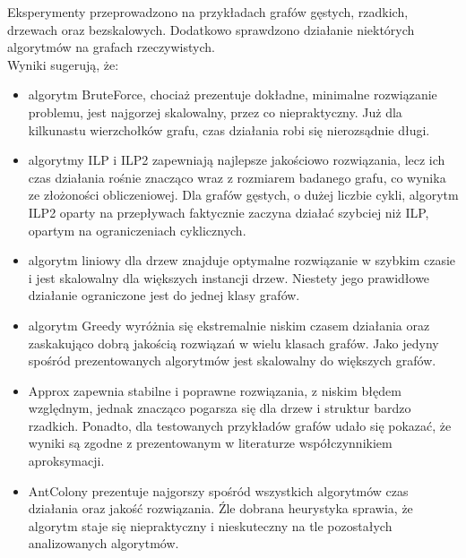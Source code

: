 Eksperymenty przeprowadzono na przykładach grafów gęstych, rzadkich, drzewach oraz bezskalowych. Dodatkowo sprawdzono działanie niektórych algorytmów na grafach rzeczywistych. \\
Wyniki sugerują, że:
\begin{itemize}
    \item algorytm BruteForce, chociaż prezentuje dokładne, minimalne rozwiązanie problemu, jest najgorzej skalowalny, przez co niepraktyczny. Już dla kilkunastu wierzchołków grafu, czas działania robi się nierozsądnie długi.
    \item algorytmy ILP i ILP2 zapewniają najlepsze jakościowo rozwiązania, lecz ich czas działania rośnie znacząco wraz z rozmiarem badanego grafu, co wynika ze złożoności obliczeniowej. Dla grafów gęstych, o dużej liczbie cykli, algorytm ILP2 oparty na przepływach faktycznie zaczyna działać szybciej niż ILP, opartym na ograniczeniach cyklicznych.
    \item algorytm liniowy dla drzew znajduje optymalne rozwiązanie w szybkim czasie i jest skalowalny dla większych instancji drzew. Niestety jego prawidłowe działanie ograniczone jest do jednej klasy grafów.
    \item algorytm Greedy wyróżnia się ekstremalnie niskim czasem działania oraz zaskakująco dobrą jakością rozwiązań w wielu klasach grafów. Jako jedyny spośród prezentowanych algorytmów jest skalowalny do większych grafów.
    \item Approx zapewnia stabilne i poprawne rozwiązania, z niskim błędem względnym, jednak znacząco pogarsza się dla drzew i struktur bardzo rzadkich. Ponadto, dla testowanych przykładów grafów udało się pokazać, że wyniki są zgodne z prezentowanym w literaturze współczynnikiem aproksymacji.
    \item AntColony prezentuje najgorszy spośród wszystkich algorytmów czas działania oraz jakość rozwiązania. Źle dobrana heurystyka sprawia, że algorytm staje się niepraktyczny i nieskuteczny na tle pozostałych analizowanych algorytmów.
\end{itemize}

